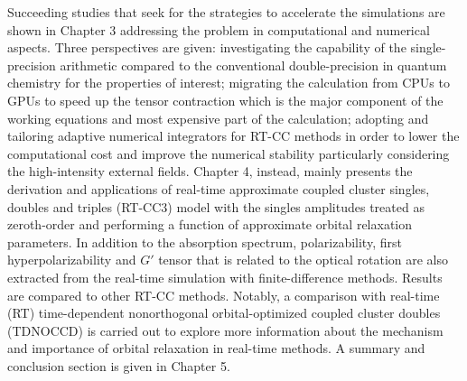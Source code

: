 Succeeding studies that seek for the strategies to accelerate the simulations are shown in Chapter 3 addressing the problem in computational and numerical aspects. Three perspectives are given: investigating the capability of the single-precision arithmetic compared to the conventional double-precision in quantum chemistry for the properties of interest; migrating the calculation from CPUs to GPUs to speed up the tensor contraction which is the major component of the working equations and most expensive part of the calculation; adopting and tailoring adaptive numerical integrators for RT-CC methods in order to lower the computational cost and improve the numerical stability particularly considering the high-intensity external fields. Chapter 4, instead, mainly presents the derivation and applications of real-time approximate coupled cluster singles, doubles and triples (RT-CC3) model with the singles amplitudes treated as zeroth-order and performing a function of  approximate orbital relaxation parameters. In addition to the absorption spectrum, polarizability, first hyperpolarizability and $G'$ tensor that is related to the optical rotation are also extracted from the real-time simulation with finite-difference methods.\cite{Ding2013} Results are compared to other RT-CC methods. Notably, a comparison with real-time (RT) time-dependent nonorthogonal orbital-optimized coupled cluster doubles (TDNOCCD)\cite{Krylov2000, Pedersen2001, Kristiansen2020} is carried out to explore more information about the mechanism and importance of orbital relaxation in real-time methods. A summary and conclusion section is given in Chapter 5. 